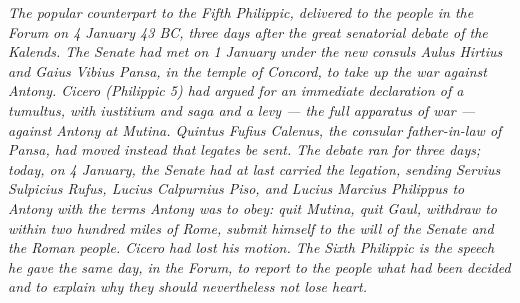 
\textit{The popular counterpart to the Fifth Philippic, delivered
to the people in the Forum on 4 January 43 BC, three days after
the great senatorial debate of the Kalends. The Senate had met
on 1 January under the new consuls Aulus Hirtius and Gaius
Vibius Pansa, in the temple of Concord, to take up the war
against Antony. Cicero (Philippic 5) had argued for an immediate
declaration of a \textit{tumultus}, with \textit{iustitium} and
\textit{saga} and a levy --- the full apparatus of war ---
against Antony at Mutina. Quintus Fufius Calenus, the
consular father-in-law of Pansa, had moved instead that
legates be sent. The debate ran for three days; today, on
4 January, the Senate had at last carried the legation, sending
Servius Sulpicius Rufus, Lucius Calpurnius Piso, and Lucius
Marcius Philippus to Antony with the terms Antony was to obey:
quit Mutina, quit Gaul, withdraw to within two hundred miles of
Rome, submit himself to the will of the Senate and the Roman
people. Cicero had lost his motion. The Sixth Philippic is the
speech he gave the same day, in the Forum, to report to the
people what had been decided and to explain why they should
nevertheless not lose heart.}

